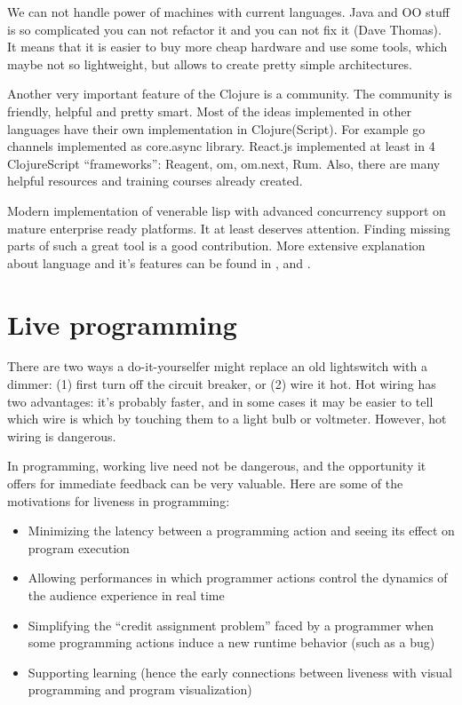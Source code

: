 We can not handle power of machines with current languages. Java and OO stuff is
so complicated you can not refactor it and you can not fix it (Dave Thomas). It
means that it is easier to buy more cheap hardware and use some tools, which
maybe not so lightweight, but allows to create pretty simple architectures.

Another very important feature of the Clojure is a community. The community is
friendly, helpful and pretty smart. Most of the ideas implemented in other
languages have their own implementation in Clojure(Script). For example go
channels implemented as core.async library. React.js implemented at least in 4
ClojureScript “frameworks”: Reagent, om, om.next, Rum. Also, there are many
helpful resources and training courses already created.

Modern implementation of venerable lisp with advanced concurrency support on
mature enterprise ready platforms. It at least deserves attention. Finding
missing parts of such a great tool is a good contribution. More extensive
explanation about language and it's features can be found in
\cite{halloway2009programming}, \cite{fogus2011joy} and
\cite{hickey2008clojure}.


\section{Live programming}

There are two ways a do-it-yourselfer might replace an old lightswitch with a
dimmer: (1) first turn off the circuit breaker, or (2) wire it hot. Hot wiring
has two advantages: it’s probably faster, and in some cases it may be easier to
tell which wire is which by touching them to a light bulb or voltmeter. However,
hot wiring is dangerous.

In programming, working live need not be dangerous, and the opportunity it
offers for immediate feedback can be very valuable. Here are some of the
motivations for liveness in programming:

\begin{itemize}
\item Minimizing the latency between a programming action and seeing its effect
  on program execution
\item Allowing performances in which programmer actions control the dynamics of
  the audience experience in real time
\item Simplifying the “credit assignment problem” faced by a programmer when
  some programming actions induce a new runtime behavior (such as a bug)
\item Supporting learning (hence the early connections between liveness with
  visual programming and program visualization)
\end{itemize}

